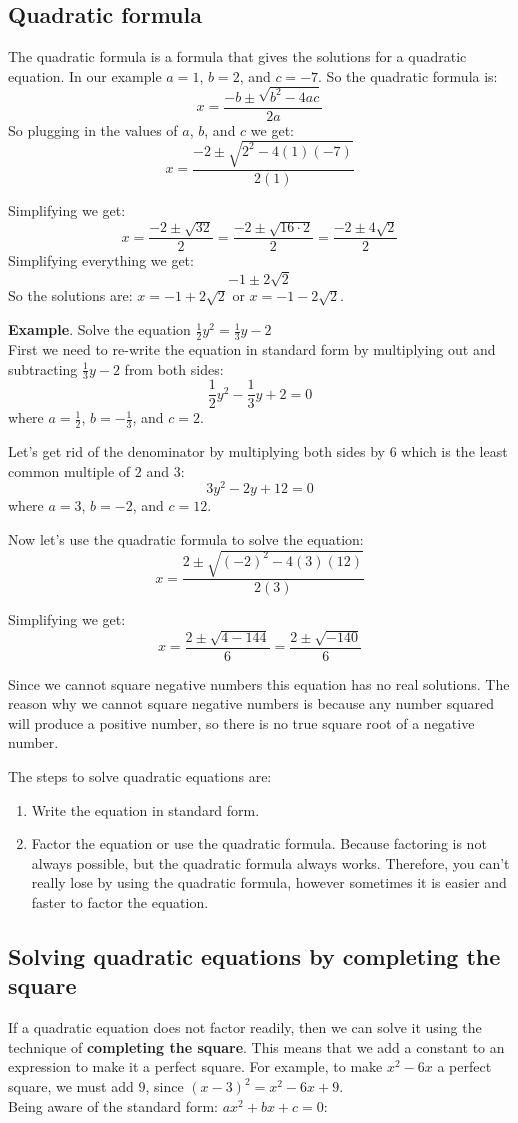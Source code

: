 \subsection{Quadratic formula}
The quadratic formula is a formula that gives the solutions for a quadratic equation. In our example $a = 1$, $b = 2$, and $c = -7$. So the quadratic formula is:
$$x=\frac{-b \pm \sqrt{b^2-4ac}}{2a}$$
So plugging in the values of $a$, $b$, and $c$ we get:
$$x=\frac{-2 \pm \sqrt{2^2-4(1)(-7)}}{2(1)}$$

Simplifying we get:
$$x=\frac{-2 \pm \sqrt{32}}{2} = \frac{-2\pm\sqrt{16\cdot2}}{2} = \frac{-2\pm4\sqrt{2}}{2} $$
Simplifying everything we get: 
$$ -1\pm2\sqrt{2} $$
So the solutions are: $x=-1+2\sqrt{2}$ or $x=-1-2\sqrt{2}$.

\textbf{Example}. Solve the equation $\frac{1}{2}y^2 = \frac{1}{3}y-2$ \\

First we need to re-write the equation in standard form by multiplying out and subtracting $\frac{1}{3}y-2$ from both sides:
$$\frac{1}{2}y^2-\frac{1}{3}y+2=0$$ where $a=\frac{1}{2}$, $b=-\frac{1}{3}$, and $c=2$.

Let's get rid of the denominator by multiplying both sides by $6$ which is the least common multiple of $2$ and $3$:
$$3y^2-2y+12=0$$ where $a=3$, $b=-2$, and $c=12$.

Now let's use the quadratic formula to solve the equation:
$$x=\frac{2\pm\sqrt{(-2)^2-4(3)(12)}}{2(3)}$$

Simplifying we get:
$$x=\frac{2\pm\sqrt{4-144}}{6} = \frac{2\pm\sqrt{-140}}{6}$$

Since we cannot square negative numbers this equation has no real solutions. 
The reason why we cannot square negative numbers is because any number squared will produce a positive number, so there is no true square root of a negative number.

The steps to solve quadratic equations are:
\begin{enumerate}
    \item Write the equation in standard form.
    \item Factor the equation or use the quadratic formula. Because factoring is not always possible, but the quadratic formula always works. Therefore, you can't really lose by using the quadratic formula, however sometimes it is easier and faster to factor the equation.
\end{enumerate}

\subsection{Solving quadratic equations by completing the square}
If a quadratic equation does not factor readily, then we can solve it using the technique of \textbf{completing the square}.
This means that we add a constant to an expression to make it a perfect square. For example, to make $x^2-6x$ a perfect square, we must add $9$, since $(x-3)^2=x^2-6x+9$. \\
Being aware of the standard form: $ax^2+bx+c=0$:

